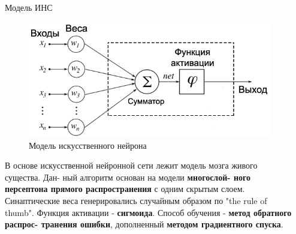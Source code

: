 \documentclass[final]{beamer}
\newlength{\sepwid}
\newlength{\onecolwid}
\newlength{\twocolwid}
\begin{document}
\begin{frame}
\begin{columns}[t]
\begin{column}{\twocolwid} %

\begin{columns}[t,totalwidth=\twocolwid] %

\begin{column}{\onecolwid}\vspace{-.74in} %


\begin{exampleblock}{Модель ИНС}

\begin{figure}
\includegraphics[width=0.9\linewidth]{img/neuro.jpeg}
\caption{Модель искусственного нейрона}
\end{figure}

В основе искусственной нейронной сети лежит модель мозга живого существа. Дан- ный алгоритм основан на модели \textbf{многослой- ного персептона прямого распространения} с одним скрытым слоем. Синаптические веса генерировались случайным образом по "the rule of thumb". Функция активации - \textbf{сигмоида}. Способ обучения - \textbf{метод обратного распрос- транения ошибки}, дополненный \textbf{ методом градиентного спуска}.


\end{exampleblock}


\end{column} %
\begin{column}{\sepwid}\end{column} %


\end{columns}
\end{column}
\end{columns}
\end{frame}
\end{document}
